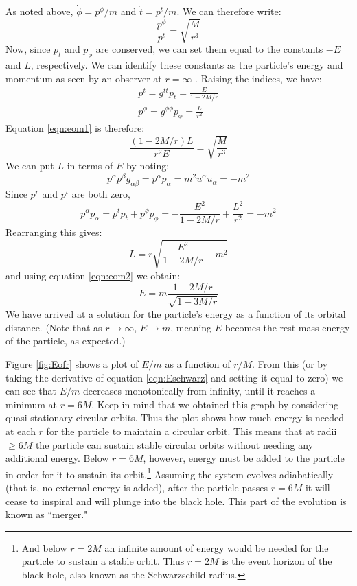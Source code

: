 As noted above, $\dot{\phi} = p^\phi/m$ and $\dot{t} = p^t/m$. We can therefore write:
\begin{equation}
\label{eqn:eom1}
\frac{p^\phi}{p^t} = \sqrt{\frac{M}{r^3}}
\end{equation}
Now, since $p_t$ and $p_\phi$ are conserved, we can set them equal to the constants $-E$ and $L$, respectively. We can identify these constants as the particle's energy and momentum as seen by an observer at $r = \infty$ \cite{Schutz}. Raising the indices, we have:
\begin{align}
p^t = g^{tt}p_t = \frac{E}{1-2M/r} \\
p^\phi = g^{\phi\phi}p_\phi = \frac{L}{r^2}
\end{align}
Equation \ref{eqn:eom1} is therefore:
\begin{equation}
\label{eqn:eom2}
\frac{(1-2M/r)L}{r^2E} = \sqrt{\frac{M}{r^3}}
\end{equation}
We can put $L$ in terms of $E$ by noting:
\begin{equation*}
p^{\alpha}p^{\beta}g_{\alpha\beta} = p^{\alpha}p_{\alpha} = m^2 u^{\alpha}u_{\alpha} = -m^2
\end{equation*}
Since $p^r$ and $p^\iota$ are both zero,
\begin{equation*}
p^{\alpha}p_{\alpha} = p^t p_t + p^\phi p_\phi = -\frac{E^2}{1-2M/r} + \frac{L^2}{r^2} = -m^2
\end{equation*}
Rearranging this gives:
\begin{equation}
L = r\sqrt{\frac{E^2}{1-2M/r} - m^2}
\end{equation}
and using equation \ref{eqn:eom2} we obtain:
\begin{equation}
\label{eqn:Eschwarz}
E = m\frac{1-2M/r}{\sqrt{1-3M/r}}
\end{equation}
We have arrived at a solution for the particle's energy as a function of its orbital distance. (Note that as $r\rightarrow \infty$, $E \rightarrow m$, meaning $E$ becomes the rest-mass energy of the particle, as expected.) 

Figure \ref{fig:Eofr} shows a plot of $E/m$ as a function of $r/M$. From this (or by taking the derivative of equation \ref{eqn:Eschwarz} and setting it equal to zero) we can see that $E/m$ decreases monotonically from infinity, until it reaches a minimum at $r=6M$. Keep in mind that we obtained this graph by considering quasi-stationary circular orbits. Thus the plot shows how much energy is needed at each $r$ for the particle to maintain a circular orbit. This means that at radii $\geq 6M$ the particle can sustain stable circular orbits without needing any additional energy. Below $r=6M$, however, energy must be added to the particle in order for it to sustain its orbit.\footnote{And below $r=2M$ an infinite amount of energy would be needed for the particle to sustain a stable orbit. Thus $r=2M$ is the event horizon of the black hole, also known as the Schwarzschild radius.} Assuming the system evolves adiabatically (that is, no external energy is added), after the particle passes $r=6M$ it will cease to inspiral and will plunge into the black hole. This part of the evolution is known as ``merger."

